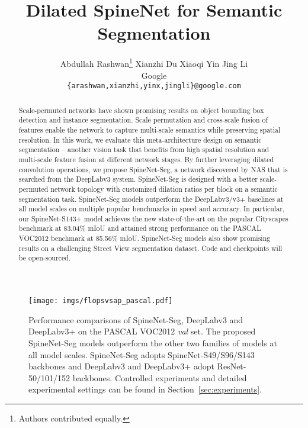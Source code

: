 \documentclass[10pt,twocolumn,letterpaper]{article}
\begin{document}
\title{Dilated SpineNet for Semantic Segmentation}

\author{
Abdullah Rashwan\thanks{Authors contributed equally.}\qquad
Xianzhi Du\footnotemark[1]\qquad
Xiaoqi Yin\qquad
Jing Li\\
Google\\
{\tt\small \{arashwan,xianzhi,yinx,jingli\}@google.com}
}

\maketitle

\ificcvfinal\thispagestyle{empty}\fi

\begin{abstract}
Scale-permuted networks have shown promising results on object bounding box detection and instance segmentation. Scale permutation and cross-scale fusion  of features enable the network to capture multi-scale semantics while preserving spatial resolution. In this work, we evaluate this meta-architecture design on semantic segmentation -- another vision task that benefits from high spatial resolution and multi-scale feature fusion at different network stages. By further leveraging dilated convolution operations, we propose SpineNet-Seg, a network discovered by NAS that is searched from the DeepLabv3 system. SpineNet-Seg is designed with a better scale-permuted network topology with customized dilation ratios per block on a semantic segmentation task. SpineNet-Seg models outperform the DeepLabv3/v3+ baselines at all model scales on multiple popular benchmarks in speed and accuracy. In particular, our SpineNet-S143+ model achieves the new state-of-the-art on the popular Cityscapes benchmark at 83.04\% mIoU and attained strong performance on the PASCAL VOC2012 benchmark at 85.56\% mIoU. SpineNet-Seg models also show promising results on a challenging Street View segmentation dataset. Code and checkpoints will be open-sourced.

\end{abstract}

\begin{figure}[h!]
    \begin{center}
    \texttt{[image: imgs/flopsvsap\_pascal.pdf]}
    \end{center}
\caption{Performance comparisons of SpineNet-Seg, DeepLabv3 and DeepLabv3+ on the PASCAL VOC2012 \textit{val} set. The proposed SpineNet-Seg models outperform the other two families of models at all model scales. SpineNet-Seg adopts SpineNet-S49/S96/S143 backbones and DeepLabv3 and DeepLabv3+ adopt ResNet-50/101/152 backbones. Controlled experiments and detailed experimental settings can be found in Section~\ref{sec:experiments}.}
    \label{fig:main_results}
\end{figure}
\end{document}
